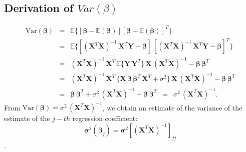 \documentclass[../main.tex]{subfiles}
\begin{document}
\subsection{Derivation of $Var(\beta)$}\label{app:variance_beta}
\begin{eqnarray*}
\mbox{Var}(\boldsymbol{\beta}) & = & \mathbb{E} \{ [\boldsymbol{\beta} - \mathbb{E}(\boldsymbol{\beta})] [\boldsymbol{\beta} - \mathbb{E}(\boldsymbol{\beta})]^{T} \}
\\
& = & \mathbb{E} \{ [(\mathbf{X}^{T} \mathbf{X})^{-1} \, \mathbf{X}^{T} \mathbf{Y} - \boldsymbol{\beta}] \, [(\mathbf{X}^{T} \mathbf{X})^{-1} \, \mathbf{X}^{T} \mathbf{Y} - \boldsymbol{\beta}]^{T} \}
\\
& = & (\mathbf{X}^{T} \mathbf{X})^{-1} \, \mathbf{X}^{T} \, \mathbb{E} \{ \mathbf{Y} \, \mathbf{Y}^{T} \} \, \mathbf{X} \, (\mathbf{X}^{T} \mathbf{X})^{-1} - \boldsymbol{\beta} \, \boldsymbol{\beta}^{T}
\\
& = & (\mathbf{X}^{T} \mathbf{X})^{-1} \, \mathbf{X}^{T} \, \{ \mathbf{X} \, \boldsymbol{\beta} \, \boldsymbol{\beta}^{T} \,  \mathbf{X}^{T} + \sigma^2 \} \, \mathbf{X} \, (\mathbf{X}^{T} \mathbf{X})^{-1} - \boldsymbol{\beta} \, \boldsymbol{\beta}^{T}
\\
& = & \boldsymbol{\beta} \, \boldsymbol{\beta}^{T}  + \sigma^2 \, (\mathbf{X}^{T} \mathbf{X})^{-1} - \boldsymbol{\beta} \, \boldsymbol{\beta}^{T}
\, \, \, = \, \, \, \sigma^2 \, (\mathbf{X}^{T} \mathbf{X})^{-1}.
\end{eqnarray*}
From $\mbox{Var}(\boldsymbol{\beta}) = \sigma^2
\, (\mathbf{X}^{T} \mathbf{X})^{-1}$, we obtain an estimate of the variance of the estimate of the $j-th$ regression coefficient:
\begin{equation}
    \boldsymbol{\sigma}^2 (\boldsymbol{\beta}_j ) = \boldsymbol{\sigma}^2 [(\mathbf{X}^{T} \mathbf{X})^{-1}]_{jj} 
\end{equation}.
\end{document}
